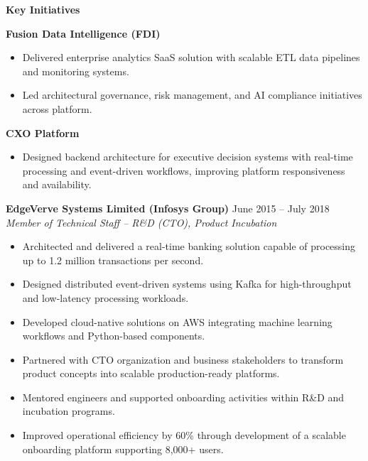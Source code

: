 \documentclass[11pt,a4paper]{article}
\begin{document}
\textbf{Key Initiatives}

\textbf{Fusion Data Intelligence (FDI)}
\begin{itemize}
    \item Delivered enterprise analytics SaaS solution with scalable ETL data pipelines and monitoring systems.
    
    \item Led architectural governance, risk management, and AI compliance initiatives across platform.
\end{itemize}

\textbf{CXO Platform}
\begin{itemize}
    \item Designed backend architecture for executive decision systems with real-time processing and event-driven workflows, improving platform responsiveness and availability.
\end{itemize}

\vspace{4pt}

\textbf{EdgeVerve Systems Limited (Infosys Group)} \hfill June 2015 -- July 2018 \\
\textit{Member of Technical Staff -- R\&D (CTO), Product Incubation}

\begin{itemize}
    \item Architected and delivered a real-time banking solution capable of processing up to 1.2 million transactions per second.
    
    \item Designed distributed event-driven systems using Kafka for high-throughput and low-latency processing workloads.
    
    \item Developed cloud-native solutions on AWS integrating machine learning workflows and Python-based components.
    
    \item Partnered with CTO organization and business stakeholders to transform product concepts into scalable production-ready platforms.
    
    \item Mentored engineers and supported onboarding activities within R\&D and incubation programs.
    
    \item Improved operational efficiency by 60\% through development of a scalable onboarding platform supporting 8,000+ users.
\end{itemize}
\end{document}

